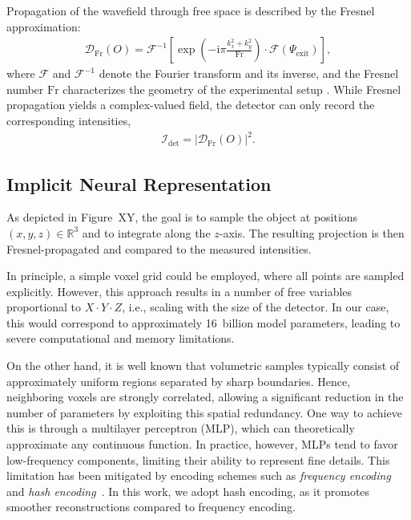 \documentclass{article}
\begin{document}
Propagation of the wavefield through free space is described by the Fresnel approximation:  
\begin{align}
	\mathcal{D}_{\text{Fr}} \left( O \right) = 
	\mathcal{F}^{-1} \left[ 
		\exp \left( - \mathrm{i} \pi \frac{k_{x}^{2} + k_{y}^{2}}{\text{Fr}} \right) 
		\cdot \mathcal{F} \left( \Psi_{\text{exit}} \right)
	\right],
	\label{eq:fresnel}
\end{align}
where $\mathcal{F}$ and $\mathcal{F}^{-1}$ denote the Fourier transform and its inverse, and the Fresnel number $\text{Fr}$ characterizes the geometry of the experimental setup \cite{paganinCoherentXrayOptics2006a}.
While Fresnel propagation yields a complex-valued field, the detector can only record the corresponding intensities,
\begin{align}
	\mathcal{I}_{\text{det}} = \left| \mathcal{D}_{\text{Fr}} \left( O \right) \right|^{2}.
\end{align}

\subsection{Implicit Neural Representation}
As depicted in Figure~XY, the goal is to sample the object at positions $\left( x,y,z \right) \in \mathbb{R}^{3}$ and to integrate along the $z$-axis.  
The resulting projection is then Fresnel-propagated and compared to the measured intensities.  

In principle, a simple voxel grid could be employed, where all points are sampled explicitly.  
However, this approach results in a number of free variables proportional to $X \cdot Y \cdot Z$, i.e., scaling with the size of the detector.  
In our case, this would correspond to approximately 16~billion model parameters, leading to severe computational and memory limitations.  

On the other hand, it is well known that volumetric samples typically consist of approximately uniform regions separated by sharp boundaries.  
Hence, neighboring voxels are strongly correlated, allowing a significant reduction in the number of parameters by exploiting this spatial redundancy.  
One way to achieve this is through a multilayer perceptron (MLP), which can theoretically approximate any continuous function.  
In practice, however, MLPs tend to favor low-frequency components, limiting their ability to represent fine details.  
This limitation has been mitigated by encoding schemes such as \emph{frequency encoding} and \emph{hash encoding}~\cite{mullerInstantNeuralGraphics2022,mildenhallNeRFRepresentingScenes2020a}.  
In this work, we adopt hash encoding, as it promotes smoother reconstructions compared to frequency encoding.  
\end{document}
